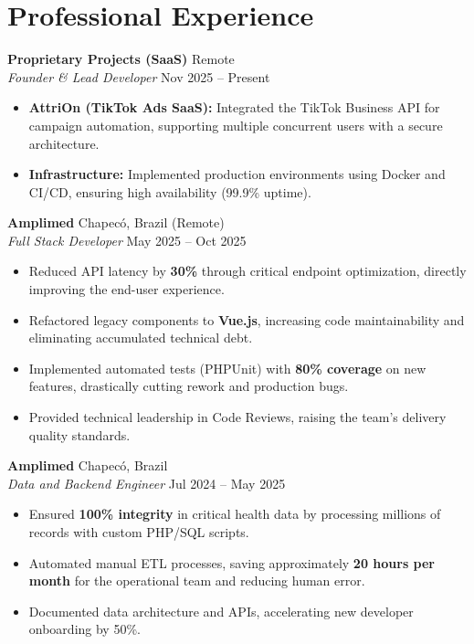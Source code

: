 \documentclass[a4paper,10pt]{article}
\begin{document}
\section{Professional Experience}

\noindent \textbf{Proprietary Projects (SaaS)} \hfill Remote \\
\textit{Founder \& Lead Developer} \hfill Nov 2025 -- Present
\begin{itemize}[noitemsep, topsep=2pt]
    \item \textbf{AttriOn (TikTok Ads SaaS):} Integrated the TikTok Business API for campaign automation, supporting multiple concurrent users with a secure architecture.
        \item \textbf{Infrastructure:} Implemented production environments using Docker and CI/CD, ensuring high availability (99.9\% uptime).
\end{itemize}

\vspace{3pt}

\noindent \textbf{Amplimed} \hfill Chapecó, Brazil (Remote) \\
\textit{Full Stack Developer} \hfill May 2025 -- Oct 2025
\begin{itemize}[noitemsep, topsep=2pt]
    \item Reduced API latency by \textbf{30\%} through critical endpoint optimization, directly improving the end-user experience.
    \item Refactored legacy components to \textbf{Vue.js}, increasing code maintainability and eliminating accumulated technical debt.
    \item Implemented automated tests (PHPUnit) with \textbf{80\% coverage} on new features, drastically cutting rework and production bugs.
    \item Provided technical leadership in Code Reviews, raising the team's delivery quality standards.
\end{itemize}

\vspace{3pt}

\noindent \textbf{Amplimed} \hfill Chapecó, Brazil \\
\textit{Data and Backend Engineer} \hfill Jul 2024 -- May 2025
\begin{itemize}[noitemsep, topsep=2pt]
    \item Ensured \textbf{100\% integrity} in critical health data by processing millions of records with custom PHP/SQL scripts.
    \item Automated manual ETL processes, saving approximately \textbf{20 hours per month} for the operational team and reducing human error.
    \item Documented data architecture and APIs, accelerating new developer onboarding by 50\%.
\end{itemize}
\end{document}
